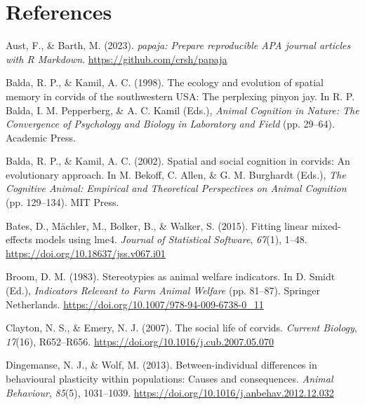 \documentclass[
  pub]{apa6}
\newlength{\cslhangindent}
\newlength{\cslentryspacingunit} %
\newenvironment{CSLReferences}[2] %
 {%
  \setlength{\parindent}{0pt}
  \ifodd #1
  \let\oldpar\par
  \def\par{\hangindent=\cslhangindent\oldpar}
  \fi
  \setlength{\parskip}{#2\cslentryspacingunit}
 }%
 {}
\begin{document}
\hypertarget{references}{%
\section{References}\label{references}}

\scriptsize

\hypertarget{refs}{}
\begin{CSLReferences}{1}{0}
\leavevmode{}%
Aust, F., \& Barth, M. (2023). \emph{{papaja}: {Prepare} reproducible {APA} journal articles with {R Markdown}}. \url{https://github.com/crsh/papaja}

\leavevmode{}%
Balda, R. P., \& Kamil, A. C. (1998). The ecology and evolution of spatial memory in corvids of the southwestern {USA}: {The} perplexing pinyon jay. In R. P. Balda, I. M. Pepperberg, \& A. C. Kamil (Eds.), \emph{Animal {Cognition} in {Nature}: {The Convergence} of {Psychology} and {Biology} in {Laboratory} and {Field}} (pp. 29--64). {Academic Press}.

\leavevmode{}%
Balda, R. P., \& Kamil, A. C. (2002). Spatial and social cognition in corvids: An evolutionary approach. In M. Bekoff, C. Allen, \& G. M. Burghardt (Eds.), \emph{The {Cognitive Animal}: {Empirical} and {Theoretical Perspectives} on {Animal Cognition}} (pp. 129--134). {MIT Press}.

\leavevmode{}%
Bates, D., Mächler, M., Bolker, B., \& Walker, S. (2015). Fitting linear mixed-effects models using {lme4}. \emph{Journal of Statistical Software}, \emph{67}(1), 1--48. \url{https://doi.org/10.18637/jss.v067.i01}

\leavevmode{}%
Broom, D. M. (1983). Stereotypies as animal welfare indicators. In D. Smidt (Ed.), \emph{Indicators {Relevant} to {Farm Animal Welfare}} (pp. 81--87). {Springer Netherlands}. \url{https://doi.org/10.1007/978-94-009-6738-0_11}

\leavevmode{}%
Clayton, N. S., \& Emery, N. J. (2007). The social life of corvids. \emph{Current Biology}, \emph{17}(16), R652--R656. \url{https://doi.org/10.1016/j.cub.2007.05.070}

\leavevmode{}%
Dingemanse, N. J., \& Wolf, M. (2013). Between-individual differences in behavioural plasticity within populations: Causes and consequences. \emph{Animal Behaviour}, \emph{85}(5), 1031--1039. \url{https://doi.org/10.1016/j.anbehav.2012.12.032}


\end{CSLReferences}
\end{document}
